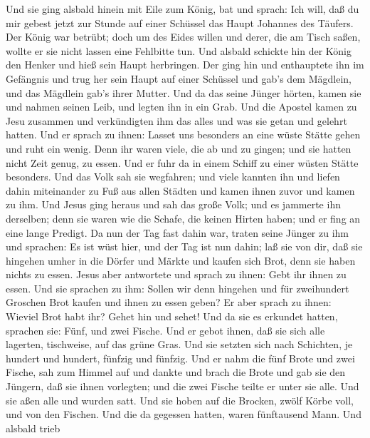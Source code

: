  Und sie ging alsbald hinein mit Eile zum König, bat und
sprach: Ich will, daß du mir gebest jetzt zur Stunde auf einer Schüssel
das Haupt Johannes des Täufers.  Der König war betrübt;
doch um des Eides willen und derer, die am Tisch saßen, wollte er sie
nicht lassen eine Fehlbitte tun.  Und alsbald schickte hin
der König den Henker und hieß sein Haupt herbringen. Der ging hin und
enthauptete ihn im Gefängnis  und trug her sein Haupt auf
einer Schüssel und gab's dem Mägdlein, und das Mägdlein gab's ihrer
Mutter.  Und da das seine Jünger hörten, kamen sie und
nahmen seinen Leib, und legten ihn in ein Grab.  Und die
Apostel kamen zu Jesu zusammen und verkündigten ihm das alles und was
sie getan und gelehrt hatten.  Und er sprach zu ihnen:
Lasset uns besonders an eine wüste Stätte gehen und ruht ein wenig. Denn
ihr waren viele, die ab und zu gingen; und sie hatten nicht Zeit genug,
zu essen.  Und er fuhr da in einem Schiff zu einer wüsten
Stätte besonders.  Und das Volk sah sie wegfahren; und
viele kannten ihn und liefen dahin miteinander zu Fuß aus allen Städten
und kamen ihnen zuvor und kamen zu ihm.  Und Jesus ging
heraus und sah das große Volk; und es jammerte ihn derselben; denn sie
waren wie die Schafe, die keinen Hirten haben; und er fing an eine lange
Predigt.  Da nun der Tag fast dahin war, traten seine
Jünger zu ihm und sprachen: Es ist wüst hier, und der Tag ist nun dahin;
 laß sie von dir, daß sie hingehen umher in die Dörfer und
Märkte und kaufen sich Brot, denn sie haben nichts zu essen.
 Jesus aber antwortete und sprach zu ihnen: Gebt ihr ihnen
zu essen. Und sie sprachen zu ihm: Sollen wir denn hingehen und für
zweihundert Groschen Brot kaufen und ihnen zu essen geben? 
Er aber sprach zu ihnen: Wieviel Brot habt ihr? Gehet hin und sehet! Und
da sie es erkundet hatten, sprachen sie: Fünf, und zwei Fische.
 Und er gebot ihnen, daß sie sich alle lagerten,
tischweise, auf das grüne Gras.  Und sie setzten sich nach
Schichten, je hundert und hundert, fünfzig und fünfzig. 
Und er nahm die fünf Brote und zwei Fische, sah zum Himmel auf und
dankte und brach die Brote und gab sie den Jüngern, daß sie ihnen
vorlegten; und die zwei Fische teilte er unter sie alle. 
Und sie aßen alle und wurden satt.  Und sie hoben auf die
Brocken, zwölf Körbe voll, und von den Fischen.  Und die da
gegessen hatten, waren fünftausend Mann.  Und alsbald trieb
